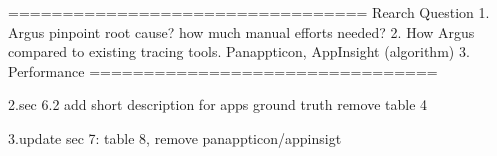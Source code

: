 =================================
Rearch Question
	1. Argus pinpoint root cause? how much manual efforts needed?
	2. How Argus compared to existing tracing tools. Panappticon, AppInsight (algorithm) 
	3. Performance
================================

2.sec 6.2
add short description for apps ground truth 
remove table 4

3.update sec 7:
table 8, remove panappticon/appinsigt
